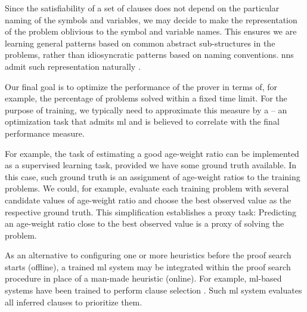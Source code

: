 Since the satisfiability of a set of clauses does not depend on the particular naming of the symbols and variables,
we may decide to make the representation of the problem oblivious to the symbol and variable names.
This ensures we are learning general patterns based on common abstract sub-structures in the problems,
rather than idiosyncratic patterns based on naming conventions.
\Glspl{nn} admit such representation naturally \cite{DBLP:conf/cade/JakubuvCOP0U20}.

Our final goal is to optimize the performance of the prover in terms of, for example, the percentage of problems solved within a fixed time limit.
For the purpose of training,
we typically need to approximate this measure by a  -- an optimization task that admits \gls{ml} and is believed to correlate with the final performance measure.

For example, the task of estimating a good age-weight ratio can be implemented as a supervised learning task, provided we have some ground truth available.
In this case, such ground truth is an assignment of age-weight ratios to the training problems.
We could, for example, evaluate each training problem with several candidate values of age-weight ratio and choose the best observed value as the respective ground truth.
This simplification establishes a proxy task:
Predicting an age-weight ratio close to the best observed value is a proxy of solving the problem.


As an alternative to configuring one or more heuristics before the proof search starts (offline),
a trained \gls{ml} system may be integrated within the proof search procedure in place of a man-made heuristic (online).
For example, \gls{ml}-based systems have been trained to perform clause selection \cite{DBLP:conf/mkm/JakubuvU17,DBLP:conf/cade/ChvalovskyJ0U19,DBLP:conf/cade/JakubuvCOP0U20,DBLP:conf/lpar/LoosISK17,DBLP:conf/cade/000121a,DBLP:conf/frocos/Suda21}.
Such \gls{ml} system evaluates all inferred clauses to prioritize them.

